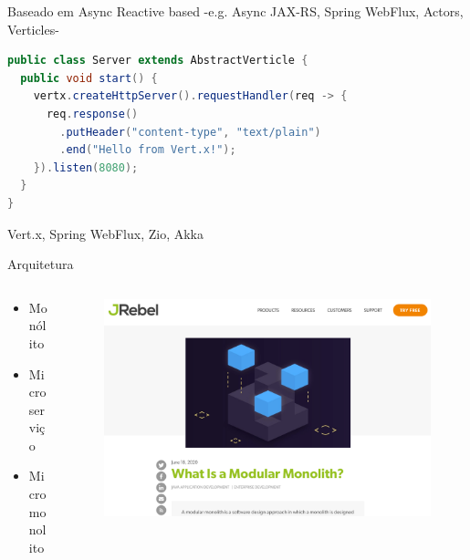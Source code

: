 \documentclass[aspectratio=169]{beamer}
\begin{document}
\begin{frame}[fragile]{Baseado em Async}
Reactive based -e.g. Async JAX-RS, Spring WebFlux, Actors, Verticles-
\begin{lstlisting}[language=Java]
public class Server extends AbstractVerticle {
  public void start() {
    vertx.createHttpServer().requestHandler(req -> {
      req.response()
        .putHeader("content-type", "text/plain")
        .end("Hello from Vert.x!");
    }).listen(8080);
  }
}
\end{lstlisting}
Vert.x, Spring WebFlux, Zio, Akka
\end{frame}


\begin{frame}{Arquitetura}

\begin{columns}
\begin{column}{0.5\textwidth}
\begin{itemize}
	\item Monólito
    \item Microserviço
    \item Micromonolito
\end{itemize}
\end{column}
\begin{column}{0.5\textwidth}  %
\begin{figure}
	\centering
	\includegraphics[width=0.9\linewidth]{Images/micromonolito.png}
\end{figure}
\end{column}
\end{columns}

\end{frame}
\end{document}
